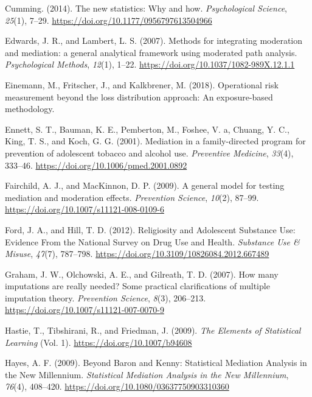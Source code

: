 \documentclass[]{DissertateUSU}
\begin{document}
\hypertarget{ref-Cumming2014}{}
Cumming. (2014). The new statistics: Why and how. \emph{Psychological
Science}, \emph{25}(1), 7--29.
\url{https://doi.org/10.1177/0956797613504966}

\hypertarget{ref-Edwards2007}{}
Edwards, J. R., and Lambert, L. S. (2007). Methods for integrating
moderation and mediation: a general analytical framework using moderated
path analysis. \emph{Psychological Methods}, \emph{12}(1), 1--22.
\url{https://doi.org/10.1037/1082-989X.12.1.1}

\hypertarget{ref-einemann2018operational}{}
Einemann, M., Fritscher, J., and Kalkbrener, M. (2018). Operational risk
measurement beyond the loss distribution approach: An exposure-based
methodology.

\hypertarget{ref-Ennett2001}{}
Ennett, S. T., Bauman, K. E., Pemberton, M., Foshee, V. a, Chuang, Y.
C., King, T. S., and Koch, G. G. (2001). Mediation in a family-directed
program for prevention of adolescent tobacco and alcohol use.
\emph{Preventive Medicine}, \emph{33}(4), 333--46.
\url{https://doi.org/10.1006/pmed.2001.0892}

\hypertarget{ref-Fairchild2009}{}
Fairchild, A. J., and MacKinnon, D. P. (2009). A general model for
testing mediation and moderation effects. \emph{Prevention Science},
\emph{10}(2), 87--99. \url{https://doi.org/10.1007/s11121-008-0109-6}

\hypertarget{ref-Ford2012}{}
Ford, J. A., and Hill, T. D. (2012). Religiosity and Adolescent
Substance Use: Evidence From the National Survey on Drug Use and Health.
\emph{Substance Use \& Misuse}, \emph{47}(7), 787--798.
\url{https://doi.org/10.3109/10826084.2012.667489}

\hypertarget{ref-Graham2007}{}
Graham, J. W., Olchowski, A. E., and Gilreath, T. D. (2007). How many
imputations are really needed? Some practical clarifications of multiple
imputation theory. \emph{Prevention Science}, \emph{8}(3), 206--213.
\url{https://doi.org/10.1007/s11121-007-0070-9}

\hypertarget{ref-Hastie2009}{}
Hastie, T., Tibshirani, R., and Friedman, J. (2009). \emph{The Elements
of Statistical Learning} (Vol. 1). \url{https://doi.org/10.1007/b94608}

\hypertarget{ref-Hayes2009}{}
Hayes, A. F. (2009). Beyond Baron and Kenny: Statistical Mediation
Analysis in the New Millennium. \emph{Statistical Mediation Analysis in
the New Millennium}, \emph{76}(4), 408--420.
\url{https://doi.org/10.1080/03637750903310360}
\end{document}
